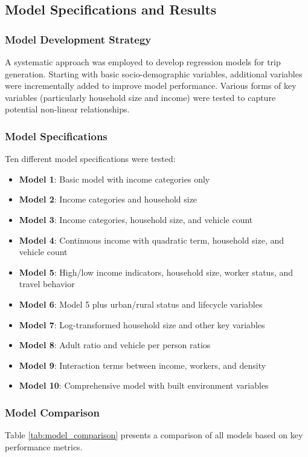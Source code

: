 \documentclass[12pt]{article}
\begin{document}
\subsection{Model Specifications and Results}
\subsubsection{Model Development Strategy}
A systematic approach was employed to develop regression models for trip generation. Starting with basic socio-demographic variables, additional variables were incrementally added to improve model performance. Various forms of key variables (particularly household size and income) were tested to capture potential non-linear relationships.

\subsubsection{Model Specifications}
Ten different model specifications were tested:
\begin{itemize}
\item \textbf{Model 1}: Basic model with income categories only
\item \textbf{Model 2}: Income categories and household size
\item \textbf{Model 3}: Income categories, household size, and vehicle count
\item \textbf{Model 4}: Continuous income with quadratic term, household size, and vehicle count
\item \textbf{Model 5}: High/low income indicators, household size, worker status, and travel behavior
\item \textbf{Model 6}: Model 5 plus urban/rural status and lifecycle variables
\item \textbf{Model 7}: Log-transformed household size and other key variables
\item \textbf{Model 8}: Adult ratio and vehicle per person ratios
\item \textbf{Model 9}: Interaction terms between income, workers, and density
\item \textbf{Model 10}: Comprehensive model with built environment variables
\end{itemize}


\subsubsection{Model Comparison}
Table \ref{tab:model_comparison} presents a comparison of all models based on key performance metrics.
\end{document}
